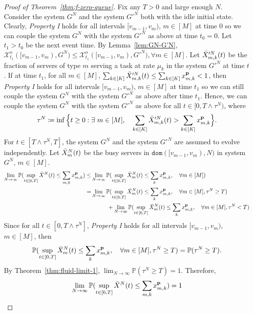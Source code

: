 \documentclass[11pt, reqno]{article}
\numberwithin{equation}{section}
\numberwithin{theorem}{section}
\newcommand{\PP}{\mathbb{P}}  				%
\newcommand{\dom}{\texttt{dom}}
\begin{document}
\begin{proof}[Proof of Theorem~\ref{thm:f-zero-queue}]
Fix any $T>0$ and large enough $N$. Consider the system $G^N$ and the system $G'^N$ both with the idle initial state. Clearly, \textit{Property I} holds for all intervals $[v_{m-1},v_m)$, $m\in[M]$ at time $0$ so we can couple the system $G^N$ with the system $G'^N$ as above at time $t_0=0$. Let $t_1>t_0$ be the next event time. 
By Lemma~\ref{lem:GN-G'N}, $\mathcal{X}^o_{t_1}([v_{m-1},v_m),G^N)\leq \mathcal{X}^o_{t_1}([v_{m-1},v_m),G'^N), \forall m\in[M]$. 
Let $\Bar{X}'^N_{m,k}(t)$ be the fraction of servers of type $m$ serving a task at rate $\mu_k$ in the system $G'^N$ at time $t$. 
If at time $t_1$, for all $m\in[M]$, $\sum_{k\in[K]}\Bar{X}'^N_{m,k}(t)\leq  \sum_{k\in[K]}x^{\mathbf{p}}_{m,k}<1$, then \textit{Property I} holds for all intervals $[v_{m-1},v_m)$, $m\in[M]$ at time $t_1$ so we can still couple the system $G^N$ with the system $G'^N$ as above after time $t_1$. 
Hence, we can couple the system $G^N$ with the system $G'^N$ as above for all $t\in[0,T\land \tau^N)$, where $$\tau^N\coloneqq\inf \Big\{t\geq 0: \exists\ m\in[M], \quad \sum_{k\in[K]}\Bar{X}'^N_{m,k}(t)> \sum_{k\in[K]}x^{\mathbf{p}}_{m,k}\Big\}.$$ 
For $t\in[T\land \tau^N,T]$, the system $G^N$ and the system $G'^N$ are assumed to evolve independently. Let $\Bar{X}^N_m(t)$ be the busy servers in $\dom([v_{m-1},v_m),N)$ in system $G^N$, $m\in[M]$.
\begin{equation*}
    \begin{split}
        \lim_{N\rightarrow\infty}\PP(\sup_{t\in[0,T]}\Bar{X}^N(t)\leq \sum_{m,k}x^{\mathbf{p}}_{m,k})\leq & \lim_{N\rightarrow\infty}\PP(\sup_{t\in[0,T]}\Bar{X}^N_m(t)\leq \sum_{k}x^{\mathbf{p}}_{m,k},\quad \forall m\in[M])\\
        =&\lim_{N\rightarrow\infty}\PP(\sup_{t\in[0,T]}\Bar{X}^N_m(t)\leq \sum_{k}x^{\mathbf{p}}_{m,k},\quad \forall m\in[M],\tau^N\geq T)\\
        &\hspace{1cm}+\lim_{N\rightarrow\infty}\PP(\sup_{t\in[0,T]}\Bar{X}^N_m(t)\leq \sum_{k}x^{\mathbf{p}}_{m,k},\quad \forall m\in[M],\tau^N<T)\\
    \end{split}
\end{equation*}
Since for all $t\in[0,T\land \tau^N]$, \textit{Property I} holds for all intervals $[v_{m-1},v_m)$, $m\in[M]$, then 
$$\PP(\sup_{t\in[0,T]}\Bar{X}^N_m(t)\leq \sum_{k}x^{\mathbf{p}}_{m,k},\quad \forall m\in[M],\tau^N\geq T)=\PP(\tau^N\geq T).$$
By Theorem~\ref{thm:fluid-limit-1}, $\lim_{N\rightarrow\infty}\PP(\tau^N\geq T)=1$. Therefore, 
$$\lim_{N\rightarrow\infty}\PP(\sup_{t\in[0,T]}\Bar{X}^N(t)\leq \sum_{m,k}x^{\mathbf{p}}_{m,k})=1$$
\end{proof}
\end{document}
